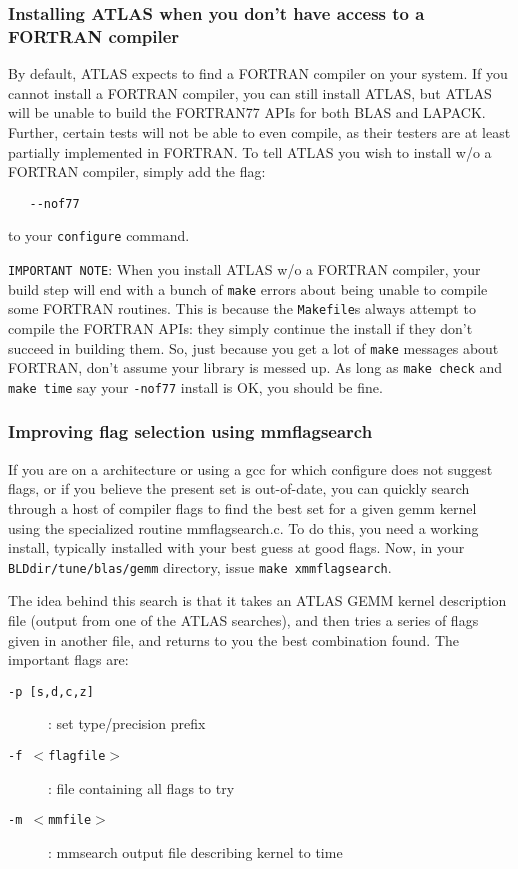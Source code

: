 \documentclass[11pt]{article}
\begin{document}
\subsubsection{Installing ATLAS when you don't have access to a FORTRAN
compiler}
\label{sec-nof77}

By default, ATLAS expects to find a FORTRAN compiler on your system.  If
you cannot install a FORTRAN compiler, you can still install ATLAS, but
ATLAS will be unable to build the FORTRAN77 APIs for both BLAS and LAPACK.
Further, certain tests will not be able to even compile, as their testers
are at least partially implemented in FORTRAN.  To tell ATLAS you wish
to install w/o a FORTRAN compiler, simply add the flag:
\vspace*{-0.1in}
\begin{verbatim}
   --nof77
\end{verbatim}
to your {\tt configure} command.

{\tt IMPORTANT NOTE}: When you install ATLAS w/o a FORTRAN compiler,
your build step will end with a bunch of {\tt make} errors about being
unable to compile some FORTRAN routines.  This is because the {\tt Makefile}s
always attempt to compile the FORTRAN APIs: they simply continue the install
if they don't succeed in building them.  So, just because you get a lot
of {\tt make} messages about FORTRAN, don't assume your library is messed
up.  As long as {\tt make check} and {\tt make time} say your {\tt -nof77}
install is OK, you should be fine.

\newpage
\subsubsection{Improving flag selection using mmflagsearch}
\label{sec-flagsearch}

If you are on a architecture or using a gcc for which configure does
not suggest flags, or if you believe the present set is out-of-date,
you can quickly search through a host of compiler flags to find the
best set for a given gemm kernel using the specialized routine
mmflagsearch.c.  To do this, you need a working install, typically
installed with your best guess at good flags.  Now, in your
{\tt BLDdir/tune/blas/gemm} directory, issue {\tt make xmmflagsearch}.

The idea behind this search is that it takes an ATLAS GEMM kernel description
file (output from one of the ATLAS searches), and then tries a series of
flags given in another file, and returns to you the best combination found.
The important flags are:
\begin{description}
\item [{\tt -p [s,d,c,z]}] : set type/precision prefix
\vspace*{-0.1in}
\item [{\tt -f $<$flagfile$>$}]: file containing all flags to try
\vspace*{-0.1in}
\item [{\tt -m $<$mmfile$>$}]: mmsearch output file describing kernel to time
\end{description}
\end{document}
